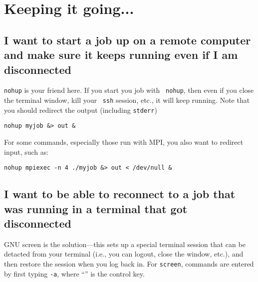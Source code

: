 \section{Keeping it going...}

\subsection{I want to start a job up on a remote computer and make sure it keeps running
  even if I am disconnected}

{\tt nohup} is your friend here.  If you start you job with {\tt
  nohup}, then even if you close the terminal window, kill your {\tt
  ssh} session, etc., it will keep running.  Note that you should redirect
the output (including {\tt stderr})

\begin{verbatim}
nohup myjob &> out &
\end{verbatim}

For some commands, especially those run with MPI, you also want to redirect input,
such as:
\begin{verbatim}
nohup mpiexec -n 4 ./myjob &> out < /dev/null &
\end{verbatim}



\subsection{I want to be able to reconnect to a job that was running in
  a terminal that got disconnected}

GNU screen is the solution---this sets up a special terminal session that
can be detacted from your terminal (i.e., you can logout, close the window, etc.),
and then restore the session when you log back in.  For {\tt screen},
commands are entered by first typing {\tt \carat-a}, where ``{\tt \carat}'' is the
control key.

